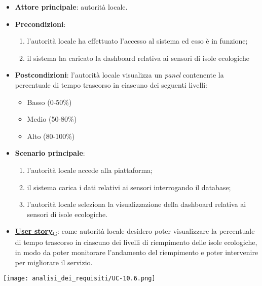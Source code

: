 \begin{itemize}
	\item \textbf{Attore principale}: autorità locale.
	\item \textbf{Precondizioni}:
	      \begin{enumerate}
		      \item l'autorità locale ha effettuato l'accesso al sistema ed esso è in funzione;
		      \item il sistema ha caricato la dashboard relativa ai sensori di isole ecologiche
	      \end{enumerate}
	\item \textbf{Postcondizioni}: l'autorità locale visualizza un \textit{panel} contenente la percentuale di tempo trascorso in ciascuno dei seguenti livelli:
	      \begin{itemize}
		      \item Basso (0-50\%)
		      \item Medio (50-80\%)
		      \item Alto (80-100\%)
	      \end{itemize}
	\item \textbf{Scenario principale}:
	      \begin{enumerate}
		      \item l'autorità locale accede alla piattaforma;
		      \item il sistema carica i dati relativi ai sensori interrogando il database;
		      \item l'autorità locale seleziona la visualizzazione della dashboard relativa ai sensori di isole ecologiche.
	      \end{enumerate}
	\item \href{https://7last.github.io/docs/rtb/documentazione-interna/glossario\#user-story}{\textbf{User story}\textsubscript{G}}:
	      come autorità locale desidero poter visualizzare la percentuale di tempo trascorso in ciascuno dei livelli di riempimento delle isole ecologiche,
	      in modo da poter monitorare l'andamento del riempimento e poter intervenire per migliorare il servizio.
\end{itemize}
\begin{center}
	\texttt{[image: analisi\_dei\_requisiti/UC-10.6.png]}
\end{center}


